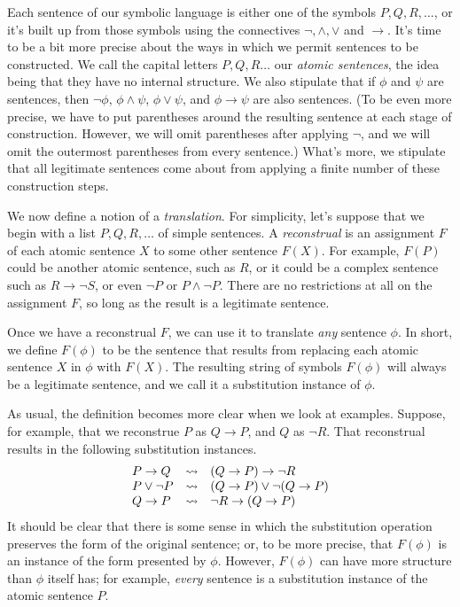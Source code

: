 Each sentence of our symbolic language is either one of the symbols
$P,Q,R,\dots $, or it's built up from those symbols using the
connectives $\neg,\wedge ,\vee$ and $\to$.  It's time to be a bit more
precise about the ways in which we permit sentences to be constructed.
We call the capital letters $P,Q,R\dots $ our \emph{\glspl{atomic
    sentence}}, the idea being that they have no internal structure.
 We also stipulate that if $\phi$ and $\psi$
are sentences, then $\neg\phi$, $\phi\wedge\psi$, $\phi\vee\psi$, and
$\phi\to\psi$ are also sentences.  (To be even more precise, we have
to put parentheses around the resulting sentence at each stage of
construction.  However, we will omit parentheses after applying
$\neg$, and we will omit the outermost parentheses from every
sentence.)  What's more, we stipulate that all legitimate sentences
come about from applying a finite number of these construction steps.

We now define a notion of a
\emph{\gls{translation}}.  For simplicity, let's
suppose that we begin with a list $P,Q,R,\dots $ of simple sentences.
A \emph{\gls{reconstrual}}  is an assignment $F$ of
each atomic sentence $X$ to some other sentence $F(X)$.  For example,
$F(P)$ could be another atomic sentence, such as $R$, or it could be a
complex sentence such as $R\to \neg S$, or even $\neg P$ or
$P\wedge\neg P$.  There are no restrictions at all on the assignment
$F$, so long as the result is a legitimate sentence.

Once we have a reconstrual $F$, we can use it to translate {\it any}
sentence $\phi$.  In short, we define $F(\phi )$ to be the sentence
that results from replacing each atomic sentence $X$ in $\phi$ with
$F(X)$.  The resulting string of symbols $F(\phi )$ will always be a
legitimate sentence, and we call it a substitution instance of $\phi$.

As usual, the definition becomes more clear when we look at examples.
Suppose, for example, that we reconstrue $P$ as $Q\to P$, and $Q$ as
$\neg R$.  That reconstrual results in the following substitution instances.
\[ \begin{array}{l l l}
     P\to Q & \leadsto  & (Q\to P)\to \neg R \\
     P\vee \neg P & \leadsto  & (Q\to P)\vee \neg (Q\to P) \\
     Q\to P & \leadsto & \neg R \to (Q\to P) \end{array} \] It should
be clear that there is some sense in which the substitution operation
preserves the form of the original sentence; or, to be more precise,
that $F(\phi )$ is an instance of the form presented by $\phi$.
However, $F(\phi )$ can have more structure than $\phi$ itself has;
for example, {\it every} sentence is a substitution instance of the
atomic sentence $P$.

